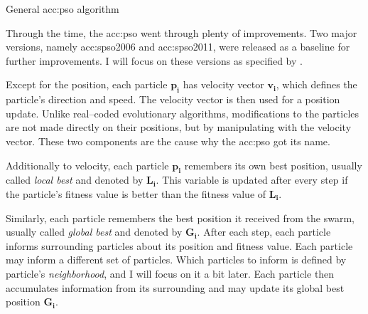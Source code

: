 \begin{algorithm}[b!]
    \caption{General \acrfull*{acc:pso} algorithm}
    \label{alg:PSOgeneral}
\end{algorithm}

Through the time, the \acrshort{acc:pso} went through plenty of improvements. Two major versions, namely \acrfull{acc:spso2006} and \acrfull{acc:spso2011}, were released as a baseline for further improvements. I will focus on these versions as specified by \citet{SPSO}.

Except for the position, each particle $\mathbf{p_i}$ has velocity vector $\mathbf{v_i}$, which defines the particle's direction and speed. The velocity vector is then used for a position update. Unlike real--coded evolutionary algorithms, modifications to the particles are not made directly on their positions, but by manipulating with the velocity vector. These two components are the cause why the \acrshort{acc:pso} got its name.

Additionally to velocity, each particle $\mathbf{p_i}$ remembers its own best position, usually called \emph{local best} and denoted by $\mathbf{L_i}$. This variable is updated after every step if the particle's fitness value is better than the fitness value of $\mathbf{L_i}$.

Similarly, each particle remembers the best position it received from the swarm, usually called \emph{global best} and denoted by $\mathbf{G_i}$. After each step, each particle informs surrounding particles about its position and fitness value. Each particle may inform a different set of particles. Which particles to inform is defined by particle's \emph{neighborhood}, and I will focus on it a bit later. Each particle then accumulates information from its surrounding and may update its global best position $\mathbf{G_i}$.

